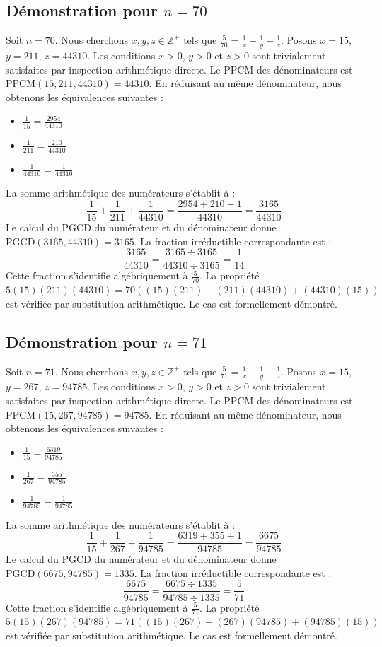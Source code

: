 \documentclass[12pt,a4paper]{article}
\begin{document}
\subsection{Démonstration pour $n = 70$}
Soit $n = 70$. Nous cherchons $x, y, z \in \mathbb{Z}^{+}$ tels que $\frac{5}{70} = \frac{1}{x} + \frac{1}{y} + \frac{1}{z}$.
Posons $x = 15$, $y = 211$, $z = 44310$.
Les conditions $x > 0$, $y > 0$ et $z > 0$ sont trivialement satisfaites par inspection arithmétique directe.
Le PPCM des dénominateurs est $\text{PPCM}(15, 211, 44310) = 44310$.
En réduisant au même dénominateur, nous obtenons les équivalences suivantes :
\begin{itemize}
    \item $\frac{1}{15} = \frac{2954}{44310}$
    \item $\frac{1}{211} = \frac{210}{44310}$
    \item $\frac{1}{44310} = \frac{1}{44310}$
\end{itemize}
La somme arithmétique des numérateurs s'établit à :
$$ \frac{1}{15} + \frac{1}{211} + \frac{1}{44310} = \frac{2954 + 210 + 1}{44310} = \frac{3165}{44310} $$
Le calcul du PGCD du numérateur et du dénominateur donne $\text{PGCD}(3165, 44310) = 3165$.
La fraction irréductible correspondante est :
$$ \frac{3165}{44310} = \frac{3165 \div 3165}{44310 \div 3165} = \frac{1}{14} $$
Cette fraction s'identifie algébriquement à $\frac{5}{70}$.
La propriété $5(15)(211)(44310) = 70((15)(211) + (211)(44310) + (44310)(15))$ est vérifiée par substitution arithmétique.
Le cas est formellement démontré.

\subsection{Démonstration pour $n = 71$}
Soit $n = 71$. Nous cherchons $x, y, z \in \mathbb{Z}^{+}$ tels que $\frac{5}{71} = \frac{1}{x} + \frac{1}{y} + \frac{1}{z}$.
Posons $x = 15$, $y = 267$, $z = 94785$.
Les conditions $x > 0$, $y > 0$ et $z > 0$ sont trivialement satisfaites par inspection arithmétique directe.
Le PPCM des dénominateurs est $\text{PPCM}(15, 267, 94785) = 94785$.
En réduisant au même dénominateur, nous obtenons les équivalences suivantes :
\begin{itemize}
    \item $\frac{1}{15} = \frac{6319}{94785}$
    \item $\frac{1}{267} = \frac{355}{94785}$
    \item $\frac{1}{94785} = \frac{1}{94785}$
\end{itemize}
La somme arithmétique des numérateurs s'établit à :
$$ \frac{1}{15} + \frac{1}{267} + \frac{1}{94785} = \frac{6319 + 355 + 1}{94785} = \frac{6675}{94785} $$
Le calcul du PGCD du numérateur et du dénominateur donne $\text{PGCD}(6675, 94785) = 1335$.
La fraction irréductible correspondante est :
$$ \frac{6675}{94785} = \frac{6675 \div 1335}{94785 \div 1335} = \frac{5}{71} $$
Cette fraction s'identifie algébriquement à $\frac{5}{71}$.
La propriété $5(15)(267)(94785) = 71((15)(267) + (267)(94785) + (94785)(15))$ est vérifiée par substitution arithmétique.
Le cas est formellement démontré.
\end{document}
